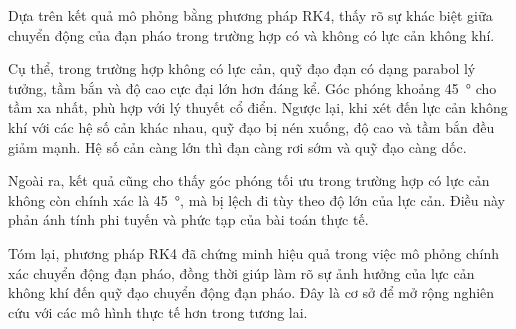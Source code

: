 Dựa trên kết quả mô phỏng bằng phương pháp RK4, thấy rõ sự khác biệt giữa chuyển động của đạn pháo trong trường hợp có và không có lực cản không khí.

Cụ thể, trong trường hợp không có lực cản, quỹ đạo đạn có dạng parabol lý tưởng, tầm bắn và độ cao cực đại lớn hơn đáng kể. Góc phóng khoảng \qty{45}{\degree} cho tầm xa nhất, phù hợp với lý thuyết cổ điển. Ngược lại, khi xét đến lực cản không khí với các hệ số cản khác nhau, quỹ đạo bị nén xuống, độ cao và tầm bắn đều giảm mạnh. Hệ số cản càng lớn thì đạn càng rơi sớm và quỹ đạo càng dốc.

Ngoài ra, kết quả cũng cho thấy góc phóng tối ưu trong trường hợp có lực cản không còn chính xác là \qty{45}{\degree}, mà bị lệch đi tùy theo độ lớn của lực cản. Điều này phản ánh tính phi tuyến và phức tạp của bài toán thực tế.

Tóm lại, phương pháp RK4 đã chứng minh hiệu quả trong việc mô phỏng chính xác chuyển động đạn pháo, đồng thời giúp làm rõ sự ảnh hưởng của lực cản không khí đến quỹ đạo chuyển động đạn pháo. Đây là cơ sở để mở rộng nghiên cứu với các mô hình thực tế hơn trong tương lai.
